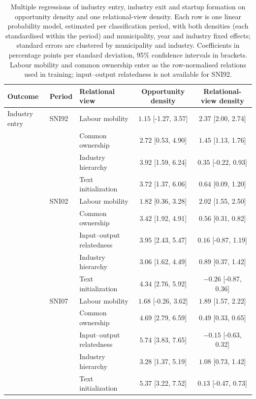 \begin{table}[htbp]
\centering
\scriptsize
\caption{Multiple regressions of industry entry, industry exit and startup formation on opportunity density and one relational-view density. Each row is one linear probability model, estimated per classification period, with both densities (each standardised within the period) and municipality, year and industry fixed effects; standard errors are clustered by municipality and industry. Coefficients in percentage points per standard deviation, 95\% confidence intervals in brackets. Labour mobility and common ownership enter as the row-normalised relations used in training; input--output relatedness is not available for SNI92.}
\label{tab:multiple_regression-additive}
\begin{tabular}{lllcc}
\toprule
Outcome & Period & Relational view & Opportunity density & Relational-view density \\
\midrule
Industry entry & SNI92 & Labour mobility & $1.15$ [-1.27, 3.57] & $2.37$ [2.00, 2.74] \\
 &  & Common ownership & $2.72$ [0.53, 4.90] & $1.45$ [1.13, 1.76] \\
 &  & Industry hierarchy & $3.92$ [1.59, 6.24] & $0.35$ [-0.22, 0.93] \\
 &  & Text initialization & $3.72$ [1.37, 6.06] & $0.64$ [0.09, 1.20] \\
\addlinespace[2pt]
 & SNI02 & Labour mobility & $1.82$ [0.36, 3.28] & $2.02$ [1.55, 2.50] \\
 &  & Common ownership & $3.42$ [1.92, 4.91] & $0.56$ [0.31, 0.82] \\
 &  & Input--output relatedness & $3.95$ [2.43, 5.47] & $0.16$ [-0.87, 1.19] \\
 &  & Industry hierarchy & $3.06$ [1.62, 4.49] & $0.89$ [0.37, 1.42] \\
 &  & Text initialization & $4.34$ [2.76, 5.92] & $-0.26$ [-0.87, 0.36] \\
\addlinespace[2pt]
 & SNI07 & Labour mobility & $1.68$ [-0.26, 3.62] & $1.89$ [1.57, 2.22] \\
 &  & Common ownership & $4.69$ [2.79, 6.59] & $0.49$ [0.33, 0.65] \\
 &  & Input--output relatedness & $5.74$ [3.83, 7.65] & $-0.15$ [-0.63, 0.32] \\
 &  & Industry hierarchy & $3.28$ [1.37, 5.19] & $1.08$ [0.73, 1.42] \\
 &  & Text initialization & $5.37$ [3.22, 7.52] & $0.13$ [-0.47, 0.73] \\

\end{tabular}
\end{table}
